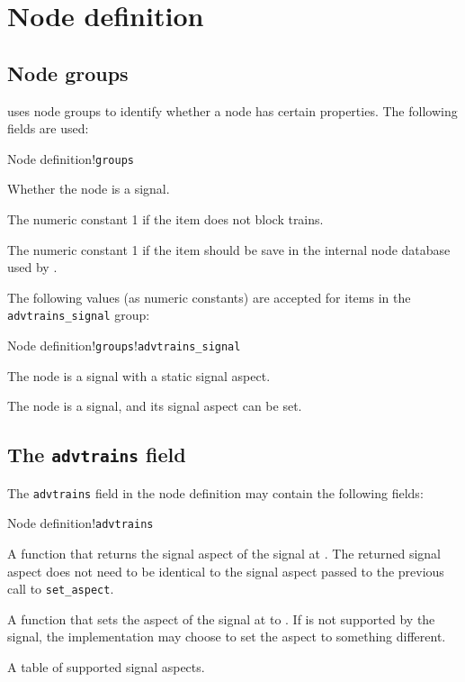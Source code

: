 \section{Node definition}

\subsection{Node groups}
\advtrains{} uses node groups to identify whether a node has certain properties. The following fields are used:
\begin{apidoc}{Node definition!\texttt{groups}}
\item {} Whether the node is a signal.
\item {} The numeric constant 1 if the item does not block trains.
\item {} The numeric constant 1 if the item should be save in the internal node database used by \advtrains{}.
\end{apidoc}

The following values (as numeric constants) are accepted for items in the \texttt{advtrains\_signal} group:
\begin{apidoc}{Node definition!\texttt{groups}!\texttt{advtrains\_signal}}
\item {} The node is a signal with a static signal aspect.
\item {} The node is a signal, and its signal aspect can be set.
\end{apidoc}

\subsection{The \texttt{advtrains} field}
The \texttt{advtrains} field in the node definition may contain the following fields:
\begin{apidoc}{Node definition!\texttt{advtrains}}
\item {} A function that returns the signal aspect of the signal  at . The returned signal aspect does not need to be identical to the signal aspect passed to the previous call to \texttt{set\_aspect}.
\item {} A function that sets the aspect of the signal  at  to . If  is not supported by the signal, the implementation may choose to set the aspect to something different.
\item {} A table of supported signal aspects.
\end{apidoc}

